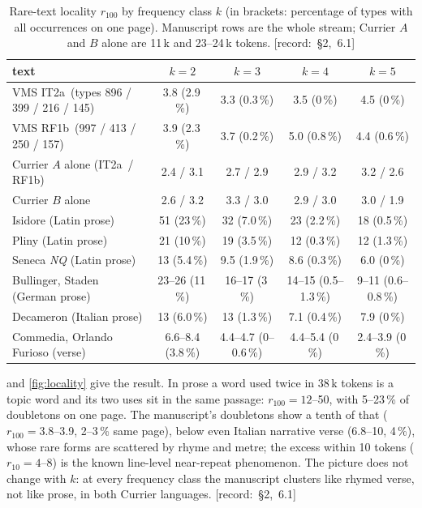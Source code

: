 \documentclass[11pt,a4paper]{article}
\newcommand{\src}[1]{{\footnotesize\color{muted}\sffamily\mbox{[record: \S#1]}}}
\newcommand{\IT}{\textcolor{it2a}{IT2a}}
\newcommand{\RF}{\textcolor{rf1b}{RF1b}}
\begin{document}
\begin{table}[t]
\centering\small
\caption{Rare-text locality $r_{100}$ by frequency class $k$ (in brackets: percentage of types with all occurrences on one page). Manuscript rows are the whole stream; Currier $A$ and $B$ alone are 11\,k and 23--24\,k tokens. \src{2, 6.1}}
\label{tab:locality}
\footnotesize\setlength{\tabcolsep}{4pt}
\begin{tabular}{@{}lcccc@{}}
\toprule
text & $k=2$ & $k=3$ & $k=4$ & $k=5$\\
\midrule
VMS \IT\ (types 896 / 399 / 216 / 145) & 3.8 (2.9\,\%) & 3.3 (0.3\,\%) & 3.5 (0\,\%) & 4.5 (0\,\%)\\
VMS \RF\ (997 / 413 / 250 / 157) & 3.9 (2.3\,\%) & 3.7 (0.2\,\%) & 5.0 (0.8\,\%) & 4.4 (0.6\,\%)\\
Currier $A$ alone (\IT\ / \RF) & 2.4 / 3.1 & 2.7 / 2.9 & 2.9 / 3.2 & 3.2 / 2.6\\
Currier $B$ alone & 2.6 / 3.2 & 3.3 / 3.0 & 2.9 / 3.0 & 3.0 / 1.9\\
\addlinespace
Isidore (Latin prose) & 51 (23\,\%) & 32 (7.0\,\%) & 23 (2.2\,\%) & 18 (0.5\,\%)\\
Pliny (Latin prose) & 21 (10\,\%) & 19 (3.5\,\%) & 12 (0.3\,\%) & 12 (1.3\,\%)\\
Seneca \emph{NQ} (Latin prose) & 13 (5.4\,\%) & 9.5 (1.9\,\%) & 8.6 (0.3\,\%) & 6.0 (0\,\%)\\
Bullinger, Staden (German prose) & 23--26 (11\,\%) & 16--17 (3\,\%) & 14--15 (0.5--1.3\,\%) & 9--11 (0.6--0.8\,\%)\\
Decameron (Italian prose) & 13 (6.0\,\%) & 13 (1.3\,\%) & 7.1 (0.4\,\%) & 7.9 (0\,\%)\\
Commedia, Orlando Furioso (verse) & 6.6--8.4 (3.8\,\%) & 4.4--4.7 (0--0.6\,\%) & 4.4--5.4 (0\,\%) & 2.4--3.9 (0\,\%)\\
\bottomrule
\end{tabular}
\end{table}

 and \cref{fig:locality} give the result. In prose a word used twice in 38\,k tokens is a topic word and its two uses sit in the same passage: $r_{100}=12$--50, with 5--23\,\% of doubletons on one page. The manuscript's doubletons show a tenth of that ($r_{100}=3.8$--3.9, 2--3\,\% same page), below even Italian narrative verse (6.8--10, 4\,\%), whose rare forms are scattered by rhyme and metre; the excess within 10 tokens ($r_{10}=4$--8) is the known line-level near-repeat phenomenon. The picture does not change with $k$: at every frequency class the manuscript clusters like rhymed verse, not like prose, in both Currier languages. \src{2, 6.1}
\end{document}
